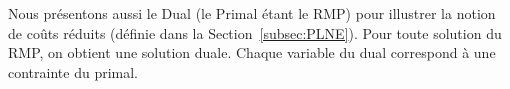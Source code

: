 Nous présentons aussi le Dual (le Primal étant le RMP) pour illustrer la notion de coûts réduits (définie dans la Section~\ref{subsec:PLNE}). 
Pour toute solution du RMP, on obtient une solution duale. Chaque variable du dual correspond à une contrainte du primal.


\begin{comment}

\textbf{tentative de dual}
On pose $X=[\lambda_s^p,\gamma]$ avec $\gamma=[\gamma_1,\gamma_2,\ldots,\gamma_{|T|}]$ et $\lambda_s^p=[\lambda_1^1,\ldots, \lambda_s^1, \ldots, \lambda_s^{|p|}]$ et $C=[c_{s}^p, -\pi_1 \omega \gamma]$
 et $b=[1^{|T|},1^{|P|},1^{|s^p|\times |P|},0^{|P| \times |same|},-p^{|T|},1^{|T|} ]$
 
Soit $Y=[y,z,n,w,l,m]$ avec 
\begin{itemize}
\item $y=[y_1,\ldots, y_{|T|}], y \geq 0$
\item $z=[z_1,\ldots, z_{|P|}], z \geq 0$
\item $n=[n_{11},\ldots, n_{|S^p||P|}], n \geq 0 $
\item $w=[w_{i,1}, \ldots,w_{i,|P|} ]$ $\forall i \in Same, w \mbox{ quelconque }$.
\item $l=[l_1,\ldots,l_{|T|}], l \geq 0$
\item $m=[m_1, \ldots, m_{|T|}], m \geq 0$
\end{itemize}

$$
M= \left (
\begin{array}{c|c}
A & I_1 \\
\hline
B & 0\\
\hline
I_2 & 0\\
\hline
C &C'\\
\hline
D&D'\\
\hline
0&I_3
\end{array}
\right)
$$
 avec $A, B, C, C', D, D', I$ des matrices.
 
 $I_i$ est la matrice identité, 
 \begin{itemize}
 \item $A$ est la matrice associée à $\sumP{p}\sumS{s}{p} a_{is}^p \schevar{s}{p}$
 \item $I_1$ est la matrice identité de taille $|T|$ 
 \item $B$ est la matrice $\sumS{s}{p}  \schevar{s}{p} $
 \item $I_2$ est la matrice de ta	ille $|P| \times |S^p|$
 \item $C$ est la matrice  $\sumS{s}{p} (a_{is}^p \schevar{s}{p} - a_{js}^p )\schevar{s}{p} $
 

\end{comment}
